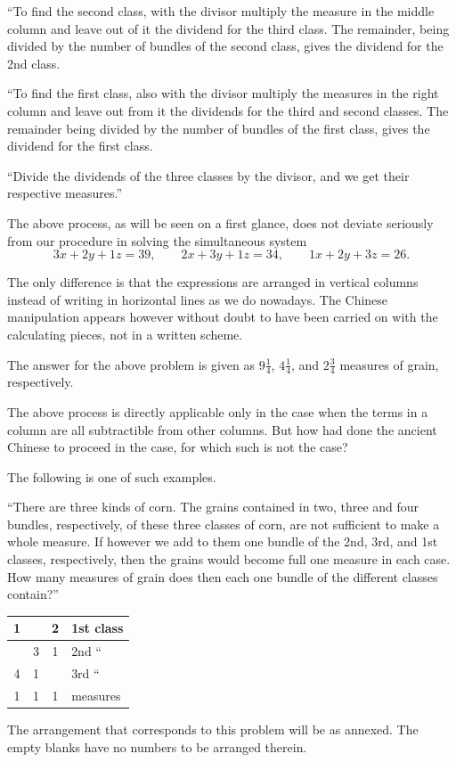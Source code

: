 \documentclass[11pt]{article}
\newcommand{\scanpage}[2]{\clearpage\setcounter{footnote}{0}\noindent{\footnotesize\color{gray}PDF page #1 · #2}\par\medskip}
\newcommand{\scanfooter}{}
\newcommand{\fangtableE}{\begin{tabular}{|c|c|c|l|}\hline 1&&2&1st class\\\hline &3&1&2nd ``\\\hline 4&1&&3rd ``\\\hline 1&1&1&measures\\\hline\end{tabular}}
\begin{document}
``To find the second class, with the divisor multiply the measure in the middle column and leave out of it the dividend for the third class. The remainder, being divided by the number of bundles of the second class, gives the dividend for the 2nd class.

``To find the first class, also with the divisor multiply the measures in the right column and leave out from it the dividends for the third and second classes. The remainder being divided by the number of bundles of the first class, gives the dividend for the first class.

``Divide the dividends of the three classes by the divisor, and we get their respective measures.''

The above process, as will be seen on a first glance, does not deviate seriously from our procedure in solving the simultaneous system
\[
3x+2y+1z=39,\qquad 2x+3y+1z=34,\qquad 1x+2y+3z=26.
\]
\scanfooter

\scanpage{0034}{Chapter 3, printed page 20}
The only difference is that the expressions are arranged in vertical columns instead of writing in horizontal lines as we do nowadays. The Chinese manipulation appears however without doubt to have been carried on with the calculating pieces, not in a written scheme.

The answer for the above problem is given as $9\frac14$, $4\frac14$, and $2\frac34$ measures of grain, respectively.

The above process is directly applicable only in the case when the terms in a column are all subtractible from other columns. But how had done the ancient Chinese to proceed in the case, for which such is not the case?

The following is one of such examples.

``There are three kinds of corn. The grains contained in two, three and four bundles, respectively, of these three classes of corn, are not sufficient to make a whole measure. If however we add to them one bundle of the 2nd, 3rd, and 1st classes, respectively, then the grains would become full one measure in each case. How many measures of grain does then each one bundle of the different classes contain?''

\begin{center}
\begin{minipage}{0.58\linewidth}
\centering\fangtableE
\end{minipage}\hfill
\begin{minipage}{0.36\linewidth}
\raggedright
The arrangement that corresponds to this problem will be as annexed. The empty blanks have no numbers to be arranged therein.
\end{minipage}
\end{center}
\end{document}
